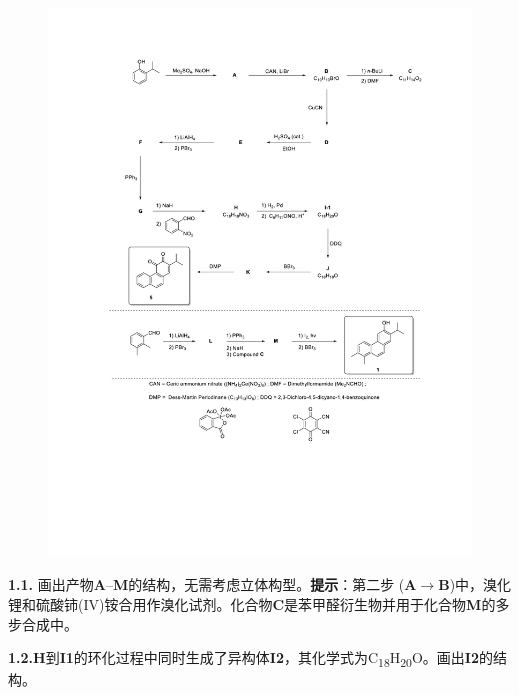 \begin{figure}[h]
	\centering
	\includegraphics[width=16cm]{./pic/t1-3.pdf}
\end{figure}

\noindent\textbf{1.1.} 画出产物\textbf{A}--\textbf{M}的结构，无需考虑立体构型。\textbf{提示}：第二步 (\textbf{A}$\rightarrow$\textbf{B})中，溴化锂和硫酸铈(IV)铵合用作溴化试剂。化合物\textbf{C}是苯甲醛衍生物并用于化合物\textbf{M}的多步合成中。

\noindent\textbf{1.2.}\textbf{H}到\textbf{I1}的环化过程中同时生成了异构体\textbf{I2}，其化学式为C\textsubscript{18}H\textsubscript{20}O。画出\textbf{I2}的结构。

